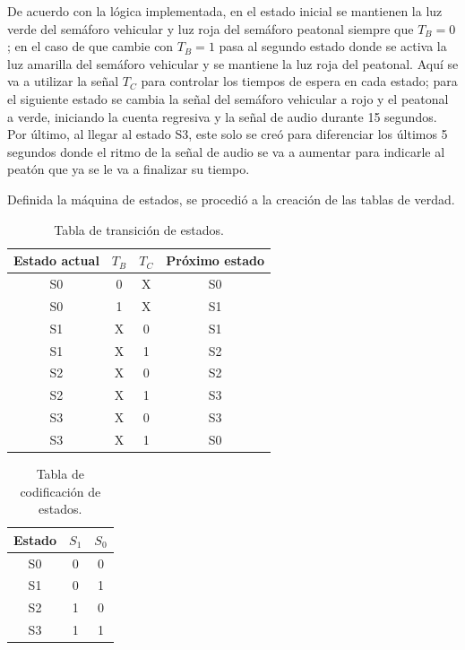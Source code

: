 \documentclass[12pt,onecolumn]{IEEEtran}
\begin{document}
De acuerdo con la lógica implementada, en el estado inicial se
mantienen la luz verde del semáforo vehicular y luz roja del
semáforo peatonal siempre que $T_B = 0$; en el caso de que cambie
con $T_B = 1$ pasa al segundo estado donde se activa la luz
amarilla del semáforo vehicular y se mantiene la luz roja del
peatonal. Aquí se va a utilizar la señal $T_C$ para controlar los
tiempos de espera en cada estado; para el siguiente estado se
cambia la señal del semáforo vehicular a rojo y el peatonal a
verde, iniciando la cuenta regresiva y la señal de audio durante
15 segundos. Por último, al llegar al estado S3, este solo se
creó para diferenciar los últimos 5 segundos donde el ritmo de
la señal de audio se va a aumentar para indicarle al peatón que
ya se le va a finalizar su tiempo.

Definida la máquina de estados, se procedió a la creación de las
tablas de verdad.

\begin{table}[H]
\centering
\caption{Tabla de transición de estados.}
\label{tab:transicion}
\begin{tabular}{c c c c}
\hline
Estado actual & $T_B$ & $T_C$ & Próximo estado \\
\hline
S0 & 0 & X & S0 \\
S0 & 1 & X & S1 \\
S1 & X & 0 & S1 \\
S1 & X & 1 & S2 \\
S2 & X & 0 & S2 \\
S2 & X & 1 & S3 \\
S3 & X & 0 & S3 \\
S3 & X & 1 & S0 \\
\hline
\end{tabular}
\end{table}

\begin{table}[H]
\centering
\caption{Tabla de codificación de estados.}
\label{tab:codificacion}
\begin{tabular}{c c c}
\hline
Estado & $S_1$ & $S_0$ \\
\hline
S0 & 0 & 0 \\
S1 & 0 & 1 \\
S2 & 1 & 0 \\
S3 & 1 & 1 \\
\hline
\end{tabular}
\end{table}
\end{document}

